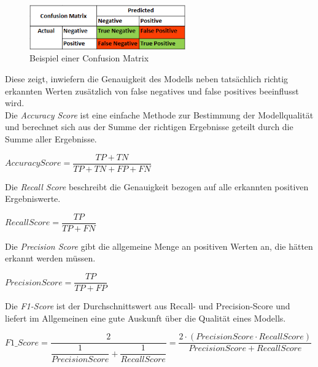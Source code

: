 \begin{figure}[h]
    \centering
    \includegraphics[width=0.6\textwidth]{pic/confusion_matrix_ex.png}
    \caption{Beispiel einer Confusion Matrix}
    \label{fig:CV}
\end{figure}

Diese zeigt, inwiefern die Genauigkeit des Modells neben tatsächlich richtig erkannten Werten zusätzlich
von false negatives und false positives beeinflusst wird.\\
\newpage
Die \textit{Accuracy Score} ist eine einfache Methode zur Bestimmung der Modellqualität und berechnet sich 
aus der Summe der richtigen Ergebnisse geteilt durch die Summe aller Ergebnisse.

\begin{center}
    $AccuracyScore = \dfrac{TP + TN}{TP + TN + FP + FN}$    
\end{center}
Die \textit{Recall Score} beschreibt die Genauigkeit bezogen auf alle erkannten positiven Ergebniswerte. 
\begin{center}
    $RecallScore = \dfrac{TP}{TP + FN}$    
\end{center}

Die \textit{Precision Score} gibt die allgemeine Menge an positiven Werten an, die hätten erkannt werden müssen.
\begin{center}
    $PrecisionScore = \dfrac{TP}{TP + FP}$    
\end{center}

Die \textit{F1-Score} ist der Durchschnittswert aus Recall- und Precision-Score und liefert im Allgemeinen eine 
gute Auskunft über die Qualität eines Modells.\\

\begin{center}
    $F1\_Score = \dfrac{2}{\dfrac{1}{PrecisionScore} + \dfrac{1}{RecallScore}} = \dfrac{2 \cdot (PrecisionScore \cdot RecallScore)}{PrecisionScore + RecallScore}$    
\end{center}

